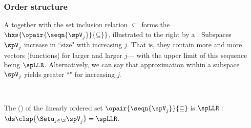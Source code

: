 \subsubsection{Order structure}

\begin{minipage}[t]{\tw-58mm}%
  A   together with the set inclusion relation $\subseteq$
  forms the  
  $\hxs{\opair{\seqn{\spV_j}}{\subseteq}}$, illustrated to the right by a .
  Subspaces $\spV_j$ increase in ``size" with increasing $j$.
  That is, they contain more and more vectors (functions) for larger and larger $j$---%
  with the upper limit of this sequence being $\spLLR$.
  Alternatively, we can say that approximation within a subspace $\spV_j$ 
  yields greater ``" for increasing $j$.
\end{minipage}%
\hfill%
\begin{minipage}[t]{55mm}%
  \mbox{}\\%
\end{minipage}%

The  () of the linearly ordered set $\opair{\seqn{\spV_j}}{\subseteq}$ is $\spLLR$ :
  \\\indentx
   $\ds\clsp{\Setu_{j\in\Z} \spV_j} = \spLLR$.
  \\


